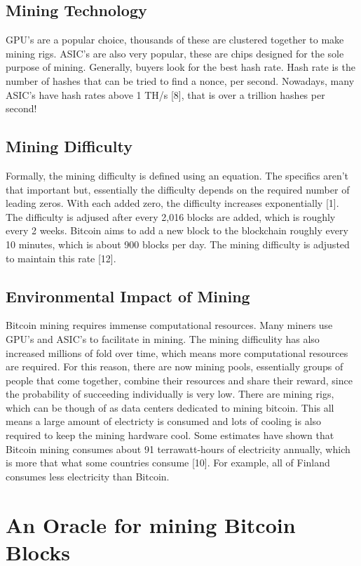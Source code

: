 \documentclass[11pt]{article} %
\begin{document}
\subsection{Mining Technology}
GPU's are a popular choice, thousands of these are clustered together to make mining rigs. ASIC's are also very popular, these are chips designed for the sole purpose of mining. Generally, buyers look for the best hash rate. Hash rate is the number of hashes that can be tried to find a nonce, per second. Nowadays, many ASIC's have hash rates above 1 TH/s [8], that is over a trillion hashes per second!
\subsection{Mining Difficulty}
Formally, the mining difficulty is defined using an equation. The specifics aren't that important but, essentially the difficulty depends on the required number of leading zeros. With each added zero, the difficulty increases exponentially [1].  The difficulty is adjused after every 2,016 blocks are added, which is roughly every 2 weeks. Bitcoin aims to add a new block to the blockchain roughly every 10 minutes, which is about 900 blocks per day. The mining difficulty is adjusted to maintain this rate [12].

\subsection{Environmental Impact of Mining}{}
Bitcoin mining requires immense computational resources. Many miners use GPU's and ASIC's to facilitate in mining. The mining difficulity has also increased millions of fold over time, which means more computational resources are required. For this reason, there are now mining pools, essentially groups of people that come together, combine their resources and share their reward, since the probability of succeeding individually is very low. There are mining rigs, which can be though of as data centers dedicated to mining bitcoin. This all means a large amount of electricty is consumed and lots of cooling is also required to keep the mining hardware cool. Some estimates have shown that Bitcoin mining consumes about 91 terrawatt-hours of electricity annually, which is more that what some countries consume [10]. For example, all of Finland consumes less electricity than Bitcoin.

\section{An Oracle for mining Bitcoin Blocks}{}
\end{document}

